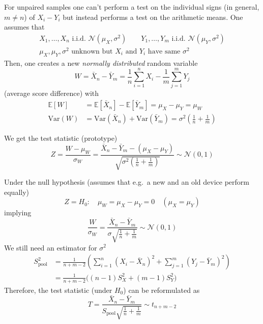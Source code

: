 For unpaired samples one can't perform a test on the individual signs (in general, $m\neq n$) of $X_i-Y_i$ but instead performs a test on the arithmetic means. One assumes that
\begin{gather*}
    X_1,\dots,X_n\text{ i.i.d. }\mathcal{N}(\mu_X,\sigma^2) \qquad Y_1,\dots,Y_m\text{ i.i.d. }\mathcal{N}(\mu_Y,\sigma^2) \\
    \mu_X,\mu_Y,\sigma^2 \text{ unknown but $X_i$ and $Y_i$ have same $\sigma^2$}
\end{gather*}
Then, one creates a new \textit{normally distributed} random variable
\begin{equation*}
    W = \bar{X}_n-\bar{Y}_m=\frac{1}{n}\sum_{i=1}^{n} X_i-\frac{1}{m}\sum_{j=1}^{m} Y_j
\end{equation*}
(average score difference) with
\begin{align*}
    \mathbb{E}[W]   & =\mathbb{E}[\bar{X}_n]-\mathbb{E}[\bar{Y}_m]=\mu_X-\mu_Y = \mu_W                              \\
    \mathrm{Var}(W) & =\mathrm{Var}(\bar{X}_n)+\mathrm{Var}(\bar{Y}_m)=\sigma^2\left(\frac{1}{n}+\frac{1}{m}\right)
\end{align*}


We get the test statistic (prototype)
\begin{equation*}
    Z=\frac{W-\mu_W}{\sigma_W}=\frac{\bar{X}_n-\bar{Y}_m-(\mu_X-\mu_Y)}{\sqrt{\sigma^2\left(\frac{1}{n}+\frac{1}{m}\right)}}\sim\mathcal{N}(0,1)
\end{equation*}

Under the null hypothesis (assumes that e.g.\ a new and an old device perform equally)
\begin{equation*}
    Z=H_0{:}\quad \mu_W = \mu_X-\mu_Y=0\quad(\mu_X=\mu_Y)
\end{equation*}
implying
\begin{equation*}
    \frac{W}{\sigma_W} = \frac{\bar{X}_n-\bar{Y}_m}{\sigma\sqrt{\frac{1}{n}+\frac{1}{m}}}\sim\mathcal{N}(0,1)
\end{equation*}
We still need an estimator for $\sigma^2$
\begin{align*}
    S_{\text{pool}}^2 & =\frac{1}{n+m-2}\left(\sum_{i=1}^n{(X_i-\bar{X}_n)}^2+\sum_{j=1}^m{(Y_j-\bar{Y}_m)}^2\right) \\
                      & =\frac{1}{n+m-2}\Bigg((n-1)S_X^2+(m-1)S_Y^2\Bigg)
\end{align*}
Therefore, the test statistic (under $H_0$) can be reformulated as
\begin{equation*}
    T=\frac{\bar{X}_n-\bar{Y}_m}{S_\text{pool}\sqrt{\frac1n+\frac1m}}\sim t_{n+m-2}
\end{equation*}

